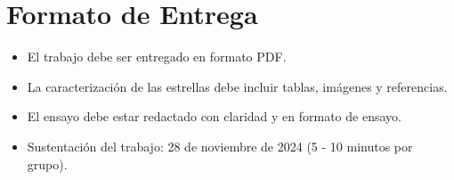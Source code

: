 \documentclass[12pt]{article}
\begin{document}
\section*{Formato de Entrega}

\begin{itemize}
    \item El trabajo debe ser entregado en formato PDF.
    \item La caracterización de las estrellas debe incluir tablas, imágenes y referencias.
    \item El ensayo debe estar redactado con claridad y en formato de ensayo.
    \item Sustentación del trabajo: 28 de noviembre de 2024 (5 - 10 minutos por grupo).
\end{itemize}
\end{document}
